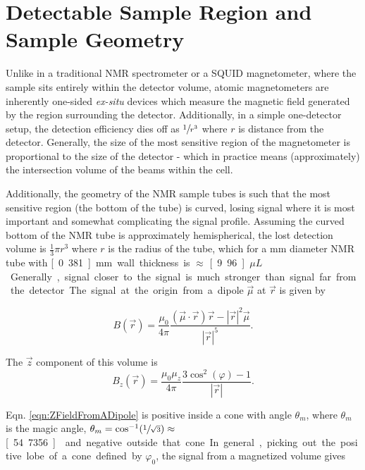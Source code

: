 \documentclass[PaulGanssle-Thesis.tex]{subfiles}
\begin{document}
\section{Detectable Sample Region and Sample Geometry}
\label{Section:NMR-Detectable-Region}
Unlike in a traditional NMR spectrometer or a SQUID magnetometer, where the sample sits entirely within the detector volume, atomic magnetometers are inherently one-sided \textit{ex-situ} devices which measure the magnetic field generated by the region surrounding the detector. Additionally, in a simple one-detector setup, the detection efficiency dies off as $\sfrac{1}{r^3}$ where $r$ is distance from the detector. Generally, the size of the most sensitive region of the magnetometer is proportional to the size of the detector - which in practice means (approximately) the intersection volume of the beams within the cell.

Additionally, the geometry of the NMR sample tubes is such that the most sensitive region (the bottom of the tube) is curved, losing signal where it is most important and somewhat complicating the signal profile. Assuming the curved bottom of the NMR tube is approximately hemispherical, the lost detection volume is $\tfrac{1}{3}\pi r^3$ where $r$ is the radius of the tube, which for a \unit[5]{mm} diameter NMR tube with \unit[0.381]{mm} wall thickness is $\approx$ \unit[9.96]{$\mu L$}. Generally, signal closer to the signal is much stronger than signal far from the detector. The signal at the origin from a dipole $\vec{\mu}$ at $\vec{r}$ is given by

\begin{equation}
\label{eqn:FieldFromADipole}
B(\vec{r}) = \frac{\mu_0}{4\pi}\frac{(\vec{\mu}\cdot\vec{r})\vec{r} - \left|\vec{r}\right|^2\vec{\mu}}{\left|\vec{r}\right|^5}.
\end{equation}

The $\vec{z}$ component of this volume is 
\begin{equation}
\label{eqn:ZFieldFromADipole}
B_z(\vec{r}) = \frac{\mu_0\mu_z}{4\pi}\frac{3\cos^2(\varphi)-1}{|\vec{r}|}.
\end{equation}

Eqn. \ref{eqn:ZFieldFromADipole} is positive inside a cone with angle $\theta_{m}$, where $\theta_{m}$ is the magic angle, $\theta_{m} = \cos^{-1}(\sfrac{1}{\sqrt{3}}) \approx $\unit[54.7356]{\degsym} and negative outside that cone. In general, picking out the positive lobe of a cone defined by $\varphi_0$, the signal from a magnetized volume gives
\end{document}

